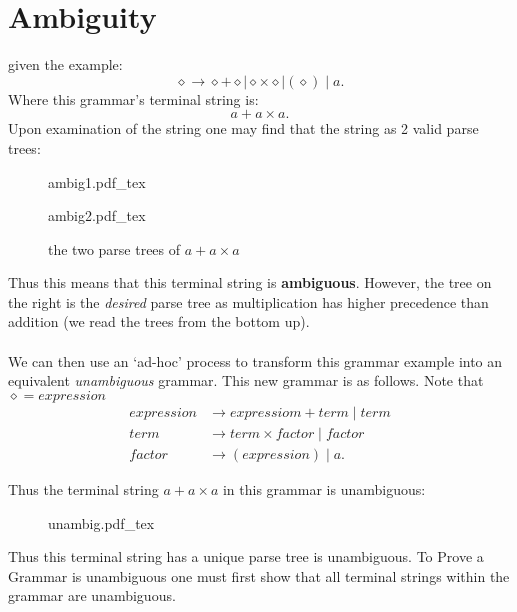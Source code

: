 \documentclass[12pt]{book}
\title{\coursetitle\linebreak\lecturename}
\author{\\Cain Susko\\ 
           \\ \\ \\
      Queen's University 
    \\School of Computing\\}
\newcommand{\incfig}[1]{%
    {#1.pdf_tex}
}
\begin{document}
\begin{titlepage}
        \maketitle
\end{titlepage}


\section*{Ambiguity}
given the example:
\[
\diamond \to \diamond + \diamond  \mid  \diamond \times \diamond  \mid (\diamond ) \mid a
.\] 
Where this grammar's terminal string is:
\[
a+a\times a
.\] 
Upon examination of the string one may find that the string as 2 valid parse trees:
\begin{figure}[h]
        \centering
        \incfig{ambig1}
        \incfig{ambig2}
        \caption{the two parse trees of $a+a\times a$}
\end{figure}

Thus this means that this terminal string is \textbf{ambiguous}.
However, the tree on the right is the \textit{desired} parse tree as multiplication has higher precedence than addition 
        (we read the trees from the bottom up).
\paragraph{}
We can then use an `ad-hoc' process to transform this grammar example into an equivalent \textit{unambiguous} grammar. This 
        new grammar is as follows. Note that $\diamond = expression$
\begin{align*}
        expression &\to expressiom + term  \mid term\\
        term &\to term \times factor  \mid factor\\
        factor &\to (expression)  \mid a
.\end{align*}
\pagebreak


Thus the terminal string $a+a\times a$ in this grammar is unambiguous:
\begin{figure}[h]
        \centering
        \incfig{unambig}
\end{figure}

Thus this terminal string has a unique parse tree is unambiguous. To Prove a Grammar is unambiguous one must first show that 
        all terminal strings within the grammar are  unambiguous.
\end{document}
